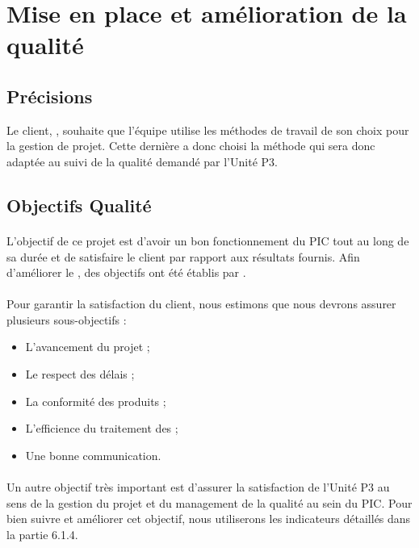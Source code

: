 \section{Mise en place et amélioration de la qualité}\label{qualite}

\subsection{Précisions}
\label{Precisions}
Le client, \nomClient , souhaite que l’équipe \nomEquipe{} utilise les méthodes de travail de son choix pour
la gestion de projet. Cette dernière a donc choisi la méthode \agile{} qui sera donc adaptée au suivi de la qualité demandé par l’Unité P3.

\subsection{Objectifs Qualité}
\label{Objectifs qualite}
\paragraph*{} L’objectif de ce projet est d’avoir un bon fonctionnement du PIC tout au long de sa durée et de satisfaire le client par rapport aux résultats fournis. Afin d’améliorer le \SMQ , des objectifs ont été établis par \nomEquipe .
\paragraph*{} Pour garantir la satisfaction du client, nous estimons que nous devrons assurer plusieurs
sous-objectifs :
\begin{itemize} 
          \item L’avancement du projet ;
          \item Le respect des délais ;
          \item La conformité des produits ;
	\item L’efficience du traitement des \FT ;
	\item Une bonne communication.
	
 \end{itemize}
\paragraph*{} Un autre objectif très important est d’assurer la satisfaction de l’Unité P3 au sens de
la gestion du projet et du management de la qualité au sein du PIC. Pour bien suivre et
améliorer cet objectif, nous utiliserons les indicateurs détaillés dans la partie 6.1.4.


